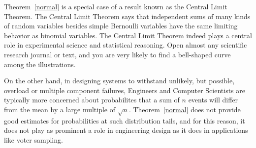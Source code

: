 \documentclass[11pt,twoside]{article}
\begin{document}
\begin{optional}
Theorem~\ref{normal} is a special case of a result known as the Central
Limit Theorem.  The Central Limit Theorem says that independent sums of
many kinds of random variables besides simple Bernoulli variables have the
same limiting behavior as binomial variables.  The Central Limit Theorem
indeed plays a central role in experimental science and statistical
reasoning.  Open almost any scientific research journal or text, and you
are very likely to find a bell-shaped curve among the illustrations.

On the other hand, in designing systems to withstand unlikely, but
possible, overload or multiple component failures, Engineers and Computer
Scientists are typically more concerned about probabilites that a sum of
$n$ events will differ from the mean by a large multiple of $\sqrt{n}$.
Theorem~\ref{normal} does not provide good estimates for probabilities at
such distribution tails, and for this reason, it does not play as prominent
a role in engineering design as it does in applications like voter
sampling.

\end{optional}
\end{document}
